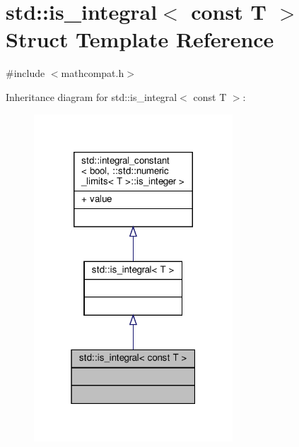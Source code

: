 \hypertarget{structstd_1_1is__integral_3_01const_01T_01_4}{}\section{std\+:\+:is\+\_\+integral$<$ const T $>$ Struct Template Reference}
\label{structstd_1_1is__integral_3_01const_01T_01_4}


{\ttfamily \#include $<$mathcompat.\+h$>$}



Inheritance diagram for std\+:\+:is\+\_\+integral$<$ const T $>$\+:\nopagebreak
\begin{figure}[H]
\begin{center}
\leavevmode
\includegraphics[width=211pt]{df/d68/structstd_1_1is__integral_3_01const_01T_01_4__inherit__graph}
\end{center}
\end{figure}


